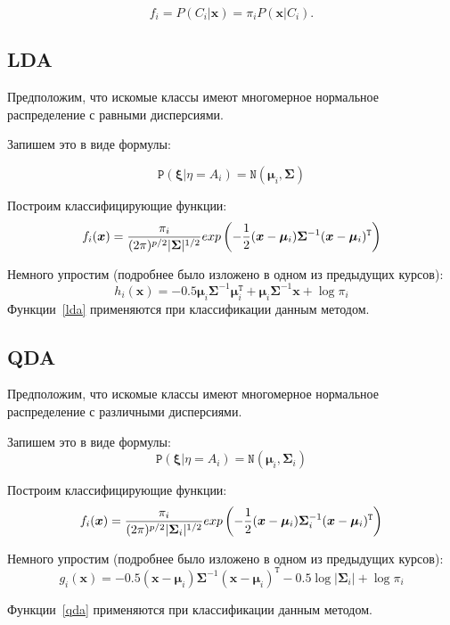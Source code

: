 \documentclass[11pt, oneside]{article}   	%
\begin{document}
		$$f_i = P(C_i|\bm{x}) = \pi_i P(\bm{x}|C_i).$$
 
		\subsection{LDA}
		Предположим, что искомые классы имеют многомерное нормальное распределение с равными дисперсиями.
		
		Запишем это в виде формулы:

		$$\mathtt{P}(\bm{\xi}|\eta = A_i) = \mathtt{N}(\bm{\mu}_i, \bm{\Sigma})$$
		
		Построим классифицирующие функции:
		$$f_i(\bm{x}) = {{\pi_i}\over{(2\pi)^{p/2}|\bm{\Sigma}|^{1/2}}}exp\left(-{{1}\over{2}}(\bm{x} - \bm{\mu}_i)\bm{\Sigma}^{-1}(\bm{x} - \bm{\mu}_i)^\mathtt{T}\right)$$
		
		Немного упростим (подробнее было изложено в одном из предыдущих курсов):
		\begin{equation}
			h_i(\bm{x}) = -0.5 \bm{\mu}_i\bm{\Sigma}^{-1}\bm{\mu}_i^\mathtt{T} + \bm{\mu}_i\bm{\Sigma}^{-1}\bm{x} + \log\pi_i
		\label{lda}
		\end{equation}
		Функции~\ref{lda} применяются при классификации данным методом.


		\subsection{QDA}
		
		Предположим, что искомые классы имеют многомерное нормальное распределение с различными дисперсиями.
		
		Запишем это в виде формулы:
		$$\mathtt{P}(\bm{\xi}|\eta = A_i) = \mathtt{N}(\bm{\mu}_i, \bm{\Sigma}_i)$$
		
		Построим классифицирующие функции:
		$$f_i(\bm{x}) = {{\pi_i}\over{(2\pi)^{p/2}|\bm{\Sigma}_i|^{1/2}}}exp\left(-{{1}\over{2}}(\bm{x} - \bm{\mu}_i)\bm{\Sigma}_i^{-1}(\bm{x} - \bm{\mu}_i)^\mathtt{T}\right)$$
		
		Немного упростим (подробнее было изложено в одном из предыдущих курсов):
		\begin{equation}
			g_i(\bm{x}) = -0.5 (\bm{x} - \bm{\mu}_i)\bm{\Sigma}^{-1}(\bm{x} - \bm{\mu}_i)^\mathtt{T} - 0.5\log|\bm{\Sigma}_i| + \log\pi_i
			\label{qda}
		\end{equation}
		
		Функции~\ref{qda} применяются при классификации данным методом.
\end{document}
